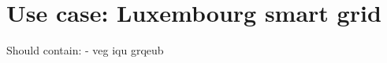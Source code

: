 \section{Use case: Luxembourg smart grid}
\label{sec:intro:use-case}

Should contain:
	-  veg iqu grqeub 
	
	